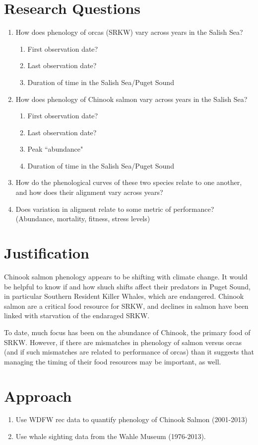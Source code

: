 \documentclass{article}
\begin{document}
\section* {Research Questions}
\begin{enumerate}
\item How does phenology of orcas (SRKW) vary across years in the Salish Sea? 
\begin{enumerate}
\item First observation date?
\item Last observation date?
\item Duration of time in the Salish Sea/Puget Sound
\end{enumerate}
\item How does phenology of Chinook salmon vary across years in the Salish Sea? 
\begin{enumerate}
\item First observation date?
\item Last observation date?
\item Peak ``abundance"
\item Duration of time in the Salish Sea/Puget Sound
\end{enumerate}
\item How do the phenological curves of these two species relate to one another, and how does their alignment vary across years?
\item Does variation in aligment relate to some metric of performance? (Abundance, mortality, fitness, stress levels)
\end{enumerate}

\section* {Justification}
\par Chinook salmon phenology appears to be shifting with climate change. It would be helpful to know if and how shuch shifts affect their predators in Puget Sound, in particular Southern Resident Killer Whales, which are endangered. Chinook salmon are a critical food resource for SRKW, and declines in salmon have been linked with starvation of the endaraged SRKW.
\par To date, much focus has been on the abundance of Chinook, the primary food of SRKW. However, if there are mismatches in phenology of salmon versus orcas (and if such mismatches are related to performance of orcas) than it suggests that managing the timing of their food resources may be important, as well. 
\section* {Approach}
\begin{enumerate}
\item Use WDFW rec data to quantify phenology of Chinook Salmon (2001-2013)
\item Use whale sighting data from the Wahle Museum (1976-2013).
\end{enumerate}
\clearpage

\end{document}
